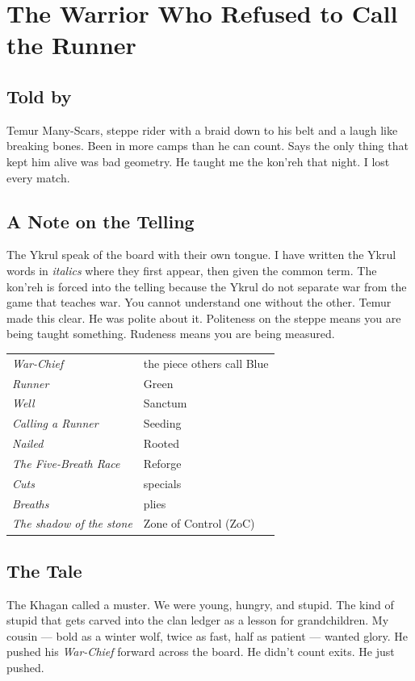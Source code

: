 \chapter{The Warrior Who Refused to Call the Runner}

\section*{Told by}

Temur Many-Scars, steppe rider with a braid down to his belt and a laugh like breaking bones. Been in more camps than he can count. Says the only thing that kept him alive was bad geometry. He taught me the kon'reh that night. I lost every match.

\section*{A Note on the Telling}

The Ykrul speak of the board with their own tongue. I have written the Ykrul words in \textit{italics} where they first appear, then given the common term. The kon'reh is forced into the telling because the Ykrul do not separate war from the game that teaches war. You cannot understand one without the other. Temur made this clear. He was polite about it. Politeness on the steppe means you are being taught something. Rudeness means you are being measured.

\medskip
\noindent\begin{tabular}{ll}
\textit{War-Chief} & the piece others call Blue \\
\textit{Runner} & Green \\
\textit{Well} & Sanctum \\
\textit{Calling a Runner} & Seeding \\
\textit{Nailed} & Rooted \\
\textit{The Five-Breath Race} & Reforge \\
\textit{Cuts} & specials \\
\textit{Breaths} & plies \\
\textit{The shadow of the stone} & Zone of Control (ZoC)
\end{tabular}

\section*{The Tale}

The Khagan called a muster. We were young, hungry, and stupid. The kind of stupid that gets carved into the clan ledger as a lesson for grandchildren. My cousin --- bold as a winter wolf, twice as fast, half as patient --- wanted glory. He pushed his \textit{War-Chief} forward across the board. He didn't count exits. He just pushed.

